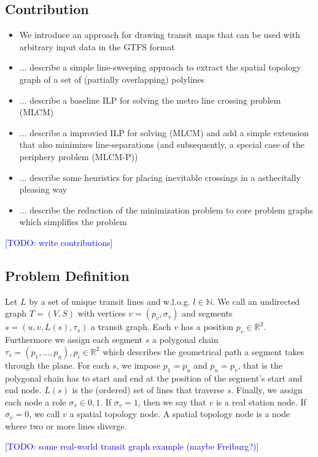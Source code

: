 \documentclass{llncs}
\newcommand\todo[1]{\textcolor{blue}{[TODO: #1]}}
\begin{document}
%
\subsection{Contribution}\label{SEC:contrib}
%
\begin{itemize}
	\item We introduce an approach for drawing transit maps that can be used with arbitrary input data in the GTFS format
	\item ... describe a simple line-sweeping approach to extract the spatial topology graph of a set of (partially overlapping) polylines
	\item ... describe a baseline ILP for solving the metro line crossing problem (MLCM)
	\item ... describe a improvied ILP for solving (MLCM) and add a simple extension that also minimizes line-separations (and subsequently, a special case of the periphery problem (MLCM-P))
	\item ... describe some heuristics for placing inevitable crossings in a asthecitally pleasing way
	\item ... describe the reduction of the minimization problem to core problem graphs which simplifies the problem
\end{itemize}

\todo{write contributions}

%
\subsection{Problem Definition}\label{SEC:def}
%
Let $L$ by a set of unique transit lines and w.l.o.g. $l \in \mathbb{N}$. We call an undirected graph $T = (V, S)$ with vertices $v = (p_v, \sigma_v)$ and segments $s = (u, v, L(s), \tau_s)$ a transit graph. Each $v$ has a position $p_v \in \mathbb{R}^2$. Furthermore we assign each segment $s$ a polygonal chain $\tau_s = (p_1, ..., p_n), p_i \in \mathbb{R}^2$ which describes the geometrical path a segment takes through the plane. For each $s$, we impose $p_1 = p_u$ and $p_n = p_v$, that is the polygonal chain has to start and end at the position of the segment's start and end node. $L(s)$ is the (ordered) set of lines that traverse $s$. Finally, we assign each node a role $\sigma_v \in {0, 1}$. If $\sigma_v = 1$, then we say that $v$ is a real station node. If $\sigma_v = 0$, we call $v$ a spatial topology node. A spatial topology node is a node where two or more lines diverge.

\todo{some real-world transit graph example (maybe Freiburg?)}
%	
\end{document}
